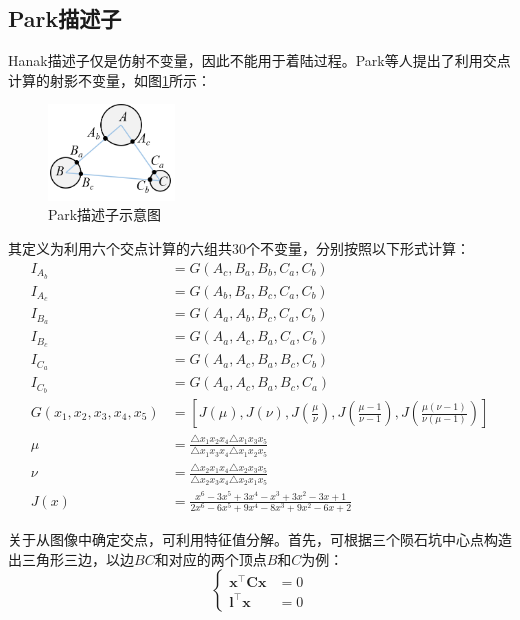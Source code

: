 \documentclass{article}
\begin{document}
\subsection{Park描述子}
Hanak描述子仅是仿射不变量，因此不能用于着陆过程。Park\cite{parkRobustCraterTriangle2019}等人提出了利用交点计算的射影不变量，如图\ref{fig:Park}所示：
\begin{figure}[H]
  \centering
  \includegraphics[width=0.3\textwidth]{Park三元组.png}
  \caption{Park描述子示意图}
  \label{fig:Park}
\end{figure}\par
其定义为利用六个交点计算的六组共30个不变量，分别按照以下形式计算：
\begin{align*}
  I_{A_b}&=G(A_c,B_a,B_b,C_a,C_b)\\
  I_{A_c}&=G(A_b,B_a,B_c,C_a,C_b)\\
  I_{B_a}&=G(A_a,A_b,B_c,C_a,C_b)\\
  I_{B_c}&=G(A_a,A_c,B_a,C_a,C_b)\\
  I_{C_a}&=G(A_a,A_c,B_a,B_c,C_b)\\
  I_{C_b}&=G(A_a,A_c,B_a,B_c,C_a)\\
  G(x_1,x_2,x_3,x_4,x_5)&=\left[J(\mu),J(\nu),J\left(\frac{\mu}{\nu}\right),J\left(\frac{\mu-1}{\nu-1}\right),J\left(\frac{\mu(\nu-1)}{\nu(\mu-1)}\right)\right]\\
  \mu& = \frac{\triangle x_1x_2x_4\triangle x_1x_3x_5}{\triangle x_1x_3x_4\triangle x_1x_2x_5}\\
  \nu&=\frac{\triangle x_2x_1x_4\triangle x_2x_3x_5}{\triangle x_2x_3x_4\triangle x_2x_1x_5}\\
  J(x)&=\frac{x^6-3x^5+3x^4-x^3+3x^2-3x+1}{2x^6-6x^5+9x^4-8x^3+9x^2-6x+2}
\end{align*}\par
关于从图像中确定交点，可利用特征值分解。首先，可根据三个陨石坑中心点构造出三角形三边，以边$BC$和对应的两个顶点$B$和$C$为例：
\begin{equation*}
  \left\{
  \begin{aligned}
    \mathbf{x^\top Cx}&=0\\
    \mathbf{l^\top x}&=0  
  \end{aligned}
  \right.
\end{equation*}\par
\end{document}
